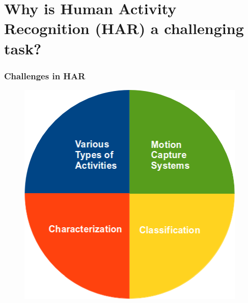 \documentclass{beamer}
\theoremstyle{definition}
\begin{document}

\section{Why is Human Activity Recognition (HAR) a challenging task?} %

% 
% 


\begin{frame}
\frametitle{Challenges in HAR}
\vspace{-0.5cm}
\begin{figure}
 \includegraphics[scale=.4]{why_is_har_a_challenging_task} 
\vspace{-0.6cm}
\end{figure} 
\end{frame}
\end{document}
